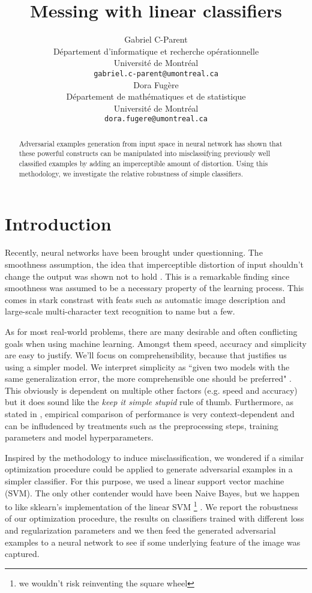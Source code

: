 \documentclass{article} %
\title{Messing with linear classifiers}
\author{
Gabriel C-Parent\\
Département d’informatique et recherche opérationnelle\\
Université de Montréal\\
\texttt{gabriel.c-parent@umontreal.ca} \\
\And
Dora Fugère \\
Département de mathématiques et de statistique \\
Université de Montréal\\
\texttt{dora.fugere@umontreal.ca} \\
}
\begin{document}
\maketitle

\begin{abstract}
Adversarial examples generation from input space in neural network
has shown that these powerful constructs can be manipulated into misclassifying
previously well classified examples by adding an imperceptible amount of
distortion. Using this methodology, we investigate the relative robustness of
simple classifiers.
\end{abstract}


\section{Introduction}

Recently, neural networks have been brought under questionning. The smoothness
assumption, the idea that imperceptible distortion of input shouldn't change
the output was shown not to hold \citep{szegedy_intriguing_2013}. This is a
remarkable finding since smoothness was assumed to be a necessary property of the
learning process.
This comes in stark constrast with feats such as automatic image description
\citep{vinyals_show_2014} and large-scale multi-character text recognition
\citep{goodfellow_multi-digit_2013} to name but a few.

As for most real-world problems, there are many desirable and often conflicting
goals when using machine learning. Amongst them speed, accuracy and simplicity
are easy to justify. We'll focus on comprehensibility, because that justifies
us using a simpler model.
We interpret simplicity as ``given two models with the same generalization error, the more
comprehensible one should be preferred" \citep{domingos_role_1999}.
This obviously is dependent on multiple other factors (e.g. speed and accuracy)
but it does sound like the \textit{keep it simple stupid} rule of thumb.
Furthermore, as stated in \citep{hand_classifier_2006}, empirical comparison of
performance is very context-dependent and can be infludenced by treatments such 
as the preprocessing steps, training parameters and model hyperparameters.

Inspired by the methodology to induce misclassification, we wondered
if a similar optimization procedure could be applied to generate adversarial
examples in a simpler classifier. For this purpose, we used a linear support
vector machine (SVM). The only other contender would have been Naive Bayes,
but we happen to like sklearn's implementation of the linear SVM \footnote{we wouldn't
risk reinventing the square wheel} \citep{pedregosa_scikit-learn:_2011}.
We report the robustness of our optimization procedure, the results on classifiers
trained with different loss and regularization parameters and we then feed the 
generated adversarial examples to a neural network to see if some underlying
feature of the image was captured.
\end{document}
